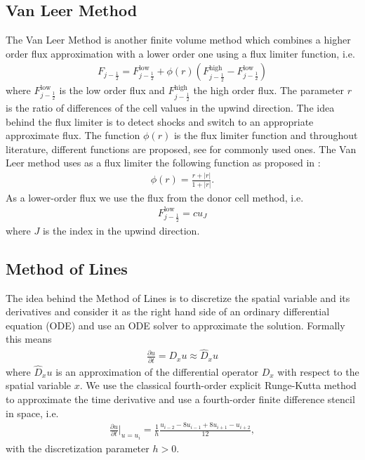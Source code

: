 \subsection{Van Leer Method}
The Van Leer Method is another finite volume method which combines a higher order flux 
approximation with a lower order one using a flux limiter function, i.e.
\begin{align*}
    F_{j - \tfrac{1}{2}} = F_{j - \tfrac{1}{2}}^{\mathrm{low}} + \phi(r)\left( F_{j - \tfrac{1}{2}}^{\mathrm{high}}  - F_{j - \tfrac{1}{2}}^{\mathrm{low}} \right)
\end{align*}
where $F_{j - \tfrac{1}{2}}^{\mathrm{low}}$ is the low order flux and 
$F_{j - \tfrac{1}{2}}^{\mathrm{high}} $ the high order flux. The parameter $r$ is the
ratio of differences of the cell values in the upwind direction. The idea behind the
flux limiter is to detect shocks and switch to an appropriate approximate flux.
The function $\phi(r)$ is the flux limiter function and throughout literature,
different functions are proposed, see \cite{LeVeque2002} for commonly used ones. The Van 
Leer method uses as a flux limiter the following function as proposed in \cite{Leer1979}:
\begin{align*}
    \phi(r) = \frac{r + |r|}{1 +  |r|}.
\end{align*}
As a lower-order flux we use the flux from the donor cell method, i.e.
\begin{align*}
    F_{j - \tfrac{1}{2}}^{\mathrm{low}} = c u_J
\end{align*}
where $J$ is the index in the upwind direction.

\subsection{Method of Lines}
The idea behind the Method of Lines is to discretize the spatial variable and its 
derivatives and consider it as the right hand side of an ordinary differential 
equation (ODE) and use an ODE solver to approximate the solution. Formally this means
\begin{align*}
    \frac{\partial u}{\partial t} = D_x u \approx \hat D_x u
\end{align*}
where $\hat D_x u$ is an approximation of the differential operator $D_x$ with respect
to the spatial variable $x$. We use the classical fourth-order explicit Runge-Kutta
method to approximate the time derivative and use a fourth-order finite difference stencil
in space, i.e.
\begin{align*}
    \frac{\partial u}{\partial t}\vert_{u = u_i} = \frac{1}{h}\frac{u_{i-2} - 8u_{i-1} + 8u_{i+1} - u_{i+2}}{12},
\end{align*}
with the discretization parameter $h > 0$.


